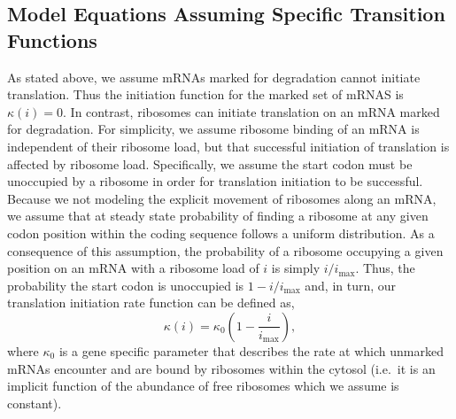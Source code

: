 \documentclass[review]{elsarticle}
\newcommand{\imax}{\ensuremath{i_{\max}}\xspace}
\begin{document}
\subsection{Model Equations Assuming Specific Transition Functions}\label{sec:assumed_forms}
As stated above, we assume mRNAs marked for degradation cannot initiate translation.
Thus the initiation function for the marked set of mRNAS is $\kappa(i) = 0$.
In contrast,  ribosomes can initiate translation on an mRNA marked for degradation.
For simplicity, we assume ribosome binding of an mRNA is independent of their ribosome load, but that successful initiation of translation is affected by ribosome load.
Specifically, we assume the start codon must be unoccupied by a ribosome in order for translation initiation to be successful.
Because we not modeling the explicit movement of ribosomes along an mRNA, we assume that at steady state probability of finding a ribosome at any given codon position within the coding sequence follows a uniform distribution.
As a consequence of this assumption, the probability of a ribosome occupying a given position on an mRNA with a ribosome load of $i$ is simply $i/\imax$.
Thus, the probability the start codon is unoccupied is $1-i/\imax$ and, in turn, our translation initiation rate function can be defined as, 
\begin{equation}\label{eq:kappa}
\kappa(i)=\kappa_0\left(1-\frac{i}{\imax}\right),
\end{equation} 
where $\kappa_0$ is a gene specific parameter that describes the rate at which unmarked mRNAs encounter and are bound by ribosomes within the cytosol (i.e.~it is an implicit function of the abundance of free ribosomes which we assume is constant).
\end{document}
